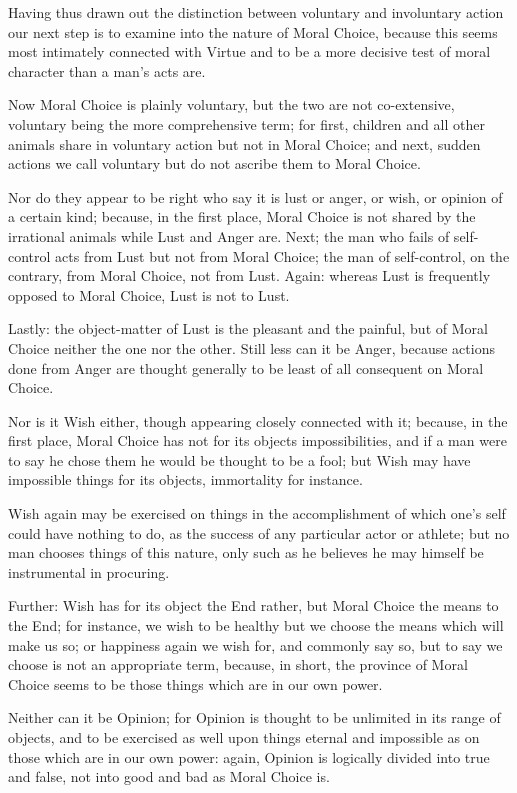 
Having thus drawn out the distinction between voluntary and involuntary action
our next step is to examine into the nature of Moral Choice, because this seems
most intimately connected with Virtue and to be a more decisive test of moral
character than a man’s acts are.

Now Moral Choice is plainly voluntary, but the two are not co-extensive,
voluntary being the more comprehensive term; for first, children and all other
animals share in voluntary action but not in Moral Choice; and next, sudden
actions we call voluntary but do not ascribe them to Moral Choice.

Nor do they appear to be right who say it is lust or anger, or wish, or opinion
of a certain kind; because, in the first place, Moral Choice is not shared by
the irrational animals while Lust and Anger are. Next; the man who fails of
self-control acts from Lust but not from Moral Choice; the man of self-control,
on the contrary, from Moral Choice, not from Lust. Again: whereas Lust is
frequently opposed to Moral Choice, Lust is not to Lust.

Lastly: the object-matter of Lust is the pleasant and the painful, but of Moral
Choice neither the one nor the other. Still less can it be Anger, because
actions done from Anger are thought generally to be least of all consequent on
Moral Choice.

Nor is it Wish either, though appearing closely connected with it; because, in
the first place, Moral Choice has not for its objects impossibilities, and if a
man were to say he chose them he would be thought to be a fool; but Wish may
have impossible things for its objects, immortality for instance.

Wish again may be exercised on things in the accomplishment of which
one’s self could have nothing to do, as the success of any particular
actor or athlete; but no man chooses things of this nature, only such as he
believes he may himself be instrumental in procuring.

Further: Wish has for its object the End rather, but Moral Choice the means to
the End; for instance, we wish to be healthy but we choose the means which will
make us so; or happiness again we wish for, and commonly say so, but to say we
choose is not an appropriate term, because, in short, the province of Moral
Choice seems to be those things which are in our own power.

Neither can it be Opinion; for Opinion is thought to be unlimited in its range
of objects, and to be exercised as well upon things eternal and impossible as
on those which are in our own power: again, Opinion is logically divided into
true and false, not into good and bad as Moral Choice is.

